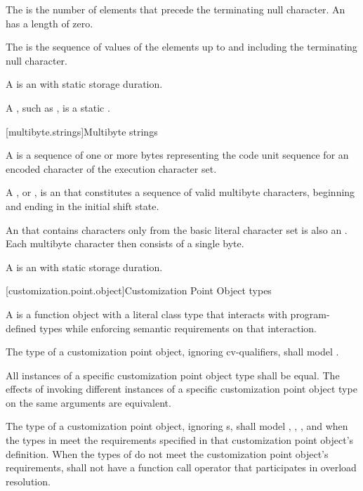 \pnum
The 
is the number of elements that
precede the terminating null character.
An 
has a length of zero.

\pnum
The 
is the sequence of values of the
elements up to and including the terminating null character.

\pnum
A 
is an \ntbs{} with
static storage duration.
\begin{footnote}
A , such as
,
is a static \ntbs{}.
\end{footnote}

[multibyte.strings]{Multibyte strings}

\pnum
A  is
a sequence of one or more bytes representing the
code unit sequence for an encoded character of the
execution character set.

%
\pnum
A ,
or \ntmbs{},
is an \ntbs{} that constitutes a
sequence of valid multibyte characters, beginning and ending in the initial
shift state.
\begin{footnote}
An \ntbs{} that contains characters only from the
basic literal character set is also an \ntmbs{}.
Each multibyte character then
consists of a single byte.
\end{footnote}

\pnum
A 
is an \ntmbs{} with static storage duration.

[customization.point.object]{Customization Point Object types}

\pnum
A  is a function object
with a literal class type that interacts with program-defined types while
enforcing semantic requirements on that interaction.

\pnum
The type of a customization point object, ignoring cv-qualifiers, shall model
.

\pnum
All instances of a specific customization point object type shall
be equal.
The effects of invoking different instances
of a specific customization point object type on the same arguments
are equivalent.

\pnum
The type  of a customization point object,
ignoring s, shall model
,
,
, and
when the types in  meet the requirements specified in that
customization point object's definition. When the types of  do
not meet the customization point object's requirements,  shall not have
a function call operator that participates in overload resolution.

